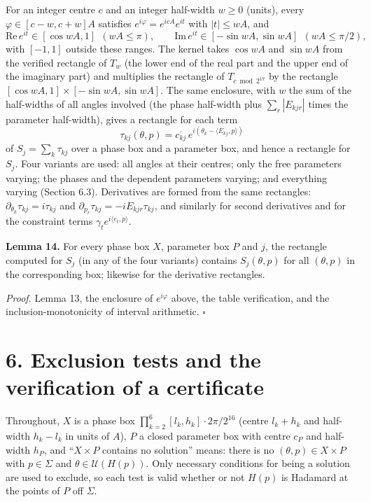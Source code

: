 \documentclass[
  11pt,
]{article}
\begin{document}
For an integer centre \(c\) and an integer half-width \(w\ge0\) (units),
every \(\varphi\in[c-w,c+w]A\) satisfies \(e^{i\varphi}=e^{icA}e^{it}\)
with \(|t|\le wA\), and \[
\mathrm{Re}\,e^{it}\in[\cos wA,1]\ \ (wA\le\pi),\qquad \mathrm{Im}\,e^{it}\in[-\sin wA,\sin wA]\ \ (wA\le\pi/2),
\] with \([-1,1]\) outside these ranges. The kernel takes \(\cos wA\)
and \(\sin wA\) from the verified rectangle of \(T_w\) (the lower end of
the real part and the upper end of the imaginary part) and multiplies
the rectangle of \(T_{c\bmod2^{17}}\) by the rectangle
\([\cos wA,1]\times[-\sin wA,\sin wA]\). The same enclosure, with \(w\)
the sum of the half-widths of all angles involved (the phase half-width
plus \(\sum_r|E_{kjr}|\) times the parameter half-width), gives a
rectangle for each term \[
\tau_{kj}(\theta,p)=\overline{c_{kj}}\,e^{i(\theta_k-\langle E_{kj},p\rangle)}
\] of \(S_j=\sum_k\tau_{kj}\) over a phase box and a parameter box, and
hence a rectangle for \(S_j\). Four variants are used: all angles at
their centres; only the free parameters varying; the phases and the
dependent parameters varying; and everything varying (Section 6.3).
Derivatives are formed from the same rectangles:
\(\partial_{\theta_k}\tau_{kj}=i\tau_{kj}\) and
\(\partial_{p_r}\tau_{kj}=-iE_{kjr}\tau_{kj}\), and similarly for second
derivatives and for the constraint terms
\(\gamma_te^{i\langle e_t,p\rangle}\).

\textbf{Lemma 14.} For every phase box \(X\), parameter box \(P\) and
\(j\), the rectangle computed for \(S_j\) (in any of the four variants)
contains \(S_j(\theta,p)\) for all \((\theta,p)\) in the corresponding
box; likewise for the derivative rectangles.

\emph{Proof.} Lemma 13, the enclosure of \(e^{i\varphi}\) above, the
table verification, and the inclusion-monotonicity of interval
arithmetic. \(\square\)

\section{6. Exclusion tests and the verification of a
certificate}\label{exclusion-tests-and-the-verification-of-a-certificate}

Throughout, \(X\) is a phase box
\(\prod_{k=2}^6[l_k,h_k]\cdot2\pi/2^{16}\) (centre \(l_k+h_k\) and
half-width \(h_k-l_k\) in units of \(A\)), \(P\) a closed parameter box
with centre \(c_P\) and half-width \(h_P\), and ``\(X\times P\) contains
no solution'' means: there is no \((\theta,p)\in X\times P\) with
\(p\in\Sigma\) and \(\theta\in\mathcal U(H(p))\). Only necessary
conditions for being a solution are used to exclude, so each test is
valid whether or not \(H(p)\) is Hadamard at the points of \(P\) off
\(\Sigma\).
\end{document}
